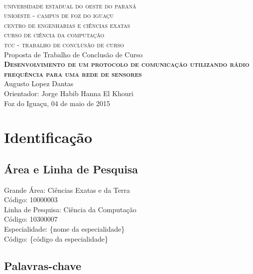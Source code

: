 \documentclass[
    12pt,               %
    a4paper,            %
    english,            %
    brazil,             %
    ]{article}
\begin{document}
\begin{center}

    \textsc{
        \large
            \\universidade estadual do oeste do paraná
            \\unioeste - campus de foz do iguaçu
            \\centro de engenharias e ciências exatas
            \\curso de ciência da computação
            \\[1 cm]tcc - trabalho de conclusão de curso
    }
    \\
    [4 cm]
    \large Proposta de Trabalho de Conclusão de Curso
    \\
    \textbf{
        \textsc{Desenvolvimento de um protocolo de comunicação utilizando rádio frequência para uma rede de sensores}
    }
    \\[5 cm]Augusto Lopez Dantas
    \\Orientador: Jorge Habib Hanna El Khouri
    \\[2 cm]Foz do Iguaçu, 04 de maio de 2015
    \cite{monard2003}

\end{center}

\thispagestyle{empty}

\section{Identificação}

    \subsection{Área e Linha de Pesquisa}
        \noindent Grande Área: Ciências Exatas e da Terra
        \\Código: 10000003
        \\[1 cm]Linha de Pesquisa: Ciência da Computação
        \\Código: 10300007
        \\[1 cm]Especialidade: \{nome da especialidade\}
        \\Código: \{código da especialidade\}

    \subsection{Palavras-chave}
\end{document}
